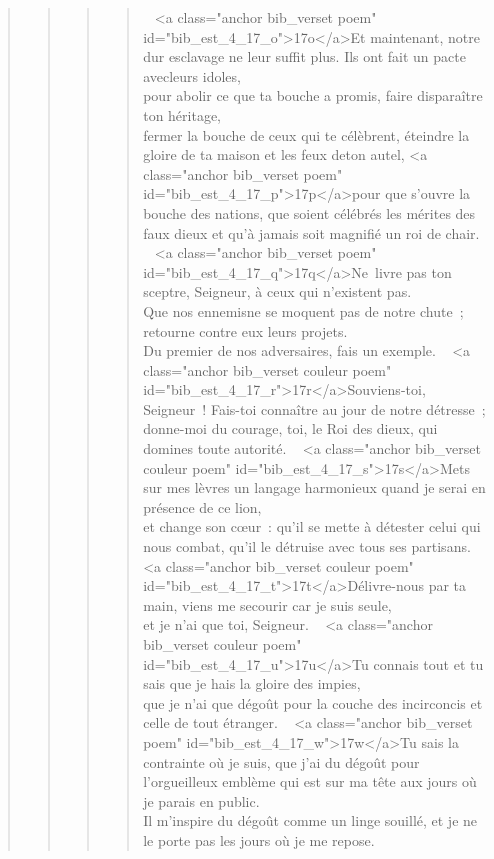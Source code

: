 \begin{verse}
\begin{verse}
\begin{verse}
\begin{verse}
         
        <a class="anchor bib_verset poem" id="bib_est_4_17_o">17o</a>Et maintenant, notre dur esclavage ne leur suffit plus.
        Ils ont fait un pacte avecleurs idoles,
        \\pour abolir ce que ta bouche a promis,
        faire disparaître ton héritage,
        \\fermer la bouche de ceux qui te célèbrent,
        éteindre la gloire de ta maison et les feux deton autel,
        <a class="anchor bib_verset poem" id="bib_est_4_17_p">17p</a>pour que s’ouvre la bouche des nations,
        que soient célébrés les mérites des faux dieux
        et qu’à jamais soit magnifié un roi de chair.
         
        <a class="anchor bib_verset poem" id="bib_est_4_17_q">17q</a>Ne livre pas ton sceptre, Seigneur,
        à ceux qui n’existent pas.
        \\Que nos ennemisne se moquent pas de notre chute ;
        retourne contre eux leurs projets.
        \\Du premier de nos adversaires,
        fais un exemple.
         
        <a class="anchor bib_verset couleur poem" id="bib_est_4_17_r">17r</a>Souviens-toi, Seigneur !
        Fais-toi connaître au jour de notre détresse ;
        \\donne-moi du courage, toi, le Roi des dieux,
        qui domines toute autorité.
         
        <a class="anchor bib_verset couleur poem" id="bib_est_4_17_s">17s</a>Mets sur mes lèvres un langage harmonieux
        quand je serai en présence de ce lion,
        \\et change son cœur :
        qu’il se mette à détester celui qui nous combat,
        qu’il le détruise avec tous ses partisans.
         
        <a class="anchor bib_verset couleur poem" id="bib_est_4_17_t">17t</a>Délivre-nous par ta main,
        viens me secourir car je suis seule,
        \\et je n’ai que toi, Seigneur.
         
        <a class="anchor bib_verset couleur poem" id="bib_est_4_17_u">17u</a>Tu connais tout et tu sais
        que je hais la gloire des impies,
        \\que je n’ai que dégoût pour la couche des incirconcis
        et celle de tout étranger.
         
        <a class="anchor bib_verset poem" id="bib_est_4_17_w">17w</a>Tu sais la contrainte où je suis,
        que j’ai du dégoût pour l’orgueilleux emblème
        qui est sur ma tête aux jours où je parais en public.
        \\Il m’inspire du dégoût comme un linge souillé,
        et je ne le porte pas les jours où je me repose.

\end{verse}
\end{verse}
\end{verse}
\end{verse}
